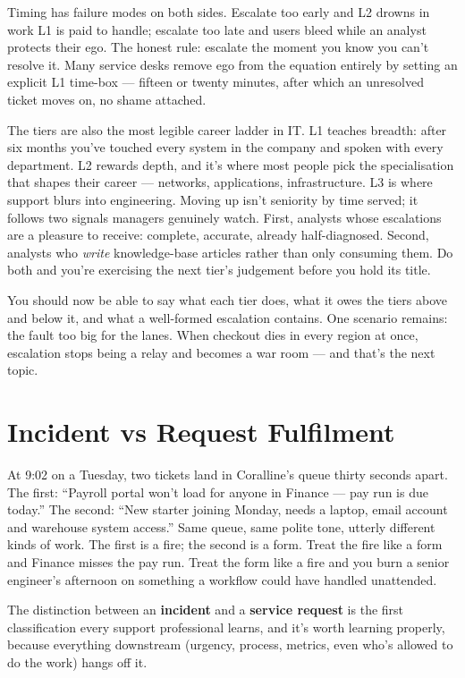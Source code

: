Timing has failure modes on both sides. Escalate too early and L2 drowns in work L1 is paid to handle; escalate too late and users bleed while an analyst protects their ego. The honest rule: escalate the moment you know you can't resolve it. Many service desks remove ego from the equation entirely by setting an explicit L1 time-box — fifteen or twenty minutes, after which an unresolved ticket moves on, no shame attached.


The tiers are also the most legible career ladder in IT. L1 teaches breadth: after six months you've touched every system in the company and spoken with every department. L2 rewards depth, and it's where most people pick the specialisation that shapes their career — networks, applications, infrastructure. L3 is where support blurs into engineering. Moving up isn't seniority by time served; it follows two signals managers genuinely watch. First, analysts whose escalations are a pleasure to receive: complete, accurate, already half-diagnosed. Second, analysts who \emph{write} knowledge-base articles rather than only consuming them. Do both and you're exercising the next tier's judgement before you hold its title.


You should now be able to say what each tier does, what it owes the tiers above and below it, and what a well-formed escalation contains. One scenario remains: the fault too big for the lanes. When checkout dies in every region at once, escalation stops being a relay and becomes a war room — and that's the next topic.

\section{Incident vs Request Fulfilment}
At 9:02 on a Tuesday, two tickets land in Coralline's queue thirty seconds apart. The first: ``Payroll portal won't load for anyone in Finance — pay run is due today.'' The second: ``New starter joining Monday, needs a laptop, email account and warehouse system access.'' Same queue, same polite tone, utterly different kinds of work. The first is a fire; the second is a form. Treat the fire like a form and Finance misses the pay run. Treat the form like a fire and you burn a senior engineer's afternoon on something a workflow could have handled unattended.


The distinction between an \textbf{incident} and a \textbf{service request} is the first classification every support professional learns, and it's worth learning properly, because everything downstream (urgency, process, metrics, even who's allowed to do the work) hangs off it.



